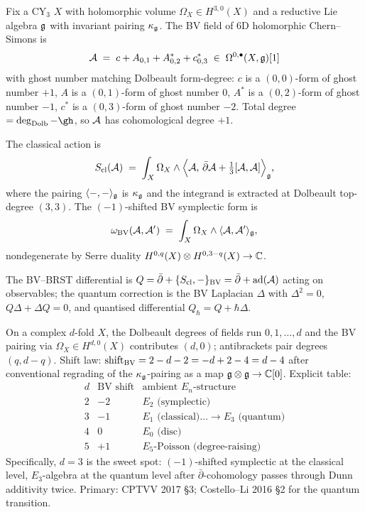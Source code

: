 \begin{definition}\ClaimStatusDefinition
\label{opus12:def:bv-datum}
Fix a CY$_3$ $X$ with holomorphic volume $\Omega_X \in H^{3,0}(X)$ and
a reductive Lie algebra $\mathfrak{g}$ with invariant pairing $\kappa_{\mathfrak{g}}$. The
BV field of 6D holomorphic Chern--Simons is
\[
\mathcal{A} \;=\; c + A_{0,1} + A^*_{0,2} + c^*_{0,3}
\;\in\; \Omega^{0,\bullet}(X, \mathfrak{g})[1]
\]
with ghost number matching Dolbeault form-degree: $c$ is a
$(0,0)$-form of ghost number $+1$, $A$ is a $(0,1)$-form of ghost
number $0$, $A^*$ is a $(0,2)$-form of ghost number $-1$, $c^*$ is a
$(0,3)$-form of ghost number $-2$. Total degree $= \deg_{\Dolb} - \gh$,
so $\mathcal{A}$ has cohomological degree $+1$.

The classical action is
\[
S_{\mathrm{cl}}(\mathcal{A}) \;=\; \int_X \Omega_X \wedge
\Bigl\langle \mathcal{A},\, \bar\partial \mathcal{A} + \tfrac{1}{3}[\mathcal{A}, \mathcal{A}]
\Bigr\rangle_{\mathfrak{g}},
\]
where the pairing $\langle -, -\rangle_{\mathfrak{g}}$ is $\kappa_{\mathfrak{g}}$ and the
integrand is extracted at Dolbeault top-degree $(3,3)$. The
$(-1)$-shifted BV symplectic form is
\[
\omega_{\mathrm{BV}}(\mathcal{A}, \mathcal{A}') \;=\; \int_X \Omega_X \wedge
\langle \mathcal{A}, \mathcal{A}' \rangle_{\mathfrak{g}},
\]
nondegenerate by Serre duality
$H^{0,q}(X) \otimes H^{0,3-q}(X) \to \mathbb{C}$.

The BV--BRST differential is
$Q = \bar\partial + \{S_{\mathrm{cl}}, -\}_{\mathrm{BV}} =
\bar\partial + \mathrm{ad}(\mathcal{A})$ acting on observables; the quantum
correction is the BV Laplacian $\Delta$ with
$\Delta^2 = 0$, $Q\Delta + \Delta Q = 0$, and quantised
differential $Q_\hbar = Q + \hbar \Delta$.
\end{definition}

\begin{proposition}\ClaimStatusProposition
\label{opus12:prop:shift-law}
On a complex $d$-fold $X$, the Dolbeault degrees of fields run
$0, 1, \ldots, d$ and the BV pairing via $\Omega_X \in
H^{d,0}(X)$ contributes $(d, 0)$; antibrackets pair degrees
$(q, d-q)$. Shift law:
$\mathrm{shift}_{\mathrm{BV}} = 2 - d - 2 = -d + 2 - 4 = d - 4$
after conventional regrading of the $\kappa_{\mathfrak{g}}$-pairing as a
map $\mathfrak{g} \otimes \mathfrak{g} \to \mathbb{C}[0]$. Explicit table:
\[
\begin{array}{c|c|c}
d & \text{BV shift} & \text{ambient }E_n\text{-structure} \\ \hline
2 & -2 & E_2\text{ (symplectic)} \\
3 & -1 & E_1\text{ (classical)}\ldots \to E_3\text{ (quantum)} \\
4 &  0 & E_0\text{ (disc)} \\
5 & +1 & E_5\text{-Poisson (degree-raising)}
\end{array}
\]
Specifically, $d = 3$ is the sweet spot: $(-1)$-shifted symplectic at
the classical level, $E_3$-algebra at the quantum level after
$\bar\partial$-cohomology passes through Dunn additivity twice. Primary:
CPTVV 2017 §3; Costello--Li 2016 §2 for the quantum transition.
\end{proposition}

